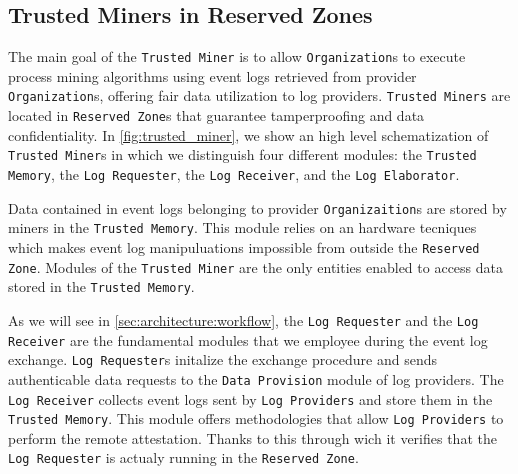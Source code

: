 \subsection{Trusted Miners in Reserved Zones}
The main goal of the \texttt{Trusted Miner} is to allow \texttt{Organization}s to execute process mining algorithms using %
event logs retrieved from provider \texttt{Organization}s, offering fair data utilization to log providers. \texttt{Trusted Miners} are located in \texttt{Reserved Zone}s that guarantee tamperproofing and data confidentiality. In \cref{fig:trusted_miner}, we show an high level schematization of \texttt{Trusted Miner}s in which we distinguish four different modules: the \texttt{Trusted Memory}, the \texttt{Log Requester}, the \texttt{Log Receiver}, and the \texttt{Log Elaborator}.

Data contained in event logs belonging to provider \texttt{Organizaition}s are stored by miners in the \texttt{Trusted Memory}. This module relies on an hardware tecniques which makes event log manipuluations impossible from outside the \texttt{Reserved Zone}. Modules of the \texttt{Trusted Miner} are the only entities enabled to access data stored in the \texttt{Trusted Memory}. %

As we will see in \cref{sec:architecture:workflow}, the \texttt{Log Requester} and the \texttt{Log Receiver} are the fundamental modules that we employee during the event log exchange. \texttt{Log Requester}s initalize the exchange procedure and sends authenticable data requests to the \texttt{Data Provision} module of log providers. The \texttt{Log Receiver} collects event logs sent by \texttt{Log Providers} and store them in the \texttt{Trusted Memory}. This module offers methodologies that allow \texttt{Log Providers} to perform the remote attestation. Thanks to this  through wich it verifies that the \texttt{Log Requester} is actualy running in the \texttt{Reserved Zone}.%

